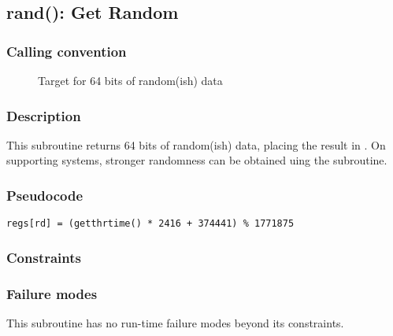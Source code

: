 \clearpage
{}
{}
\label{subr:rand}
\subsection*{rand(): Get Random}

\subsubsection*{Calling convention}

\begin{description}
\item[] Target for 64 bits of random(ish) data
\end{description}

\subsubsection*{Description}

This subroutine returns 64 bits of random(ish) data, placing the result in
.
On supporting systems, stronger randomness can be obtained uing the
\hyperref[subr:random]{} subroutine.

\subsubsection*{Pseudocode}

\begin{verbatim}
regs[rd] = (getthrtime() * 2416 + 374441) % 1771875
\end{verbatim}

\subsubsection*{Constraints}

\subsubsection*{Failure modes}

This subroutine has no run-time failure modes beyond its constraints.
